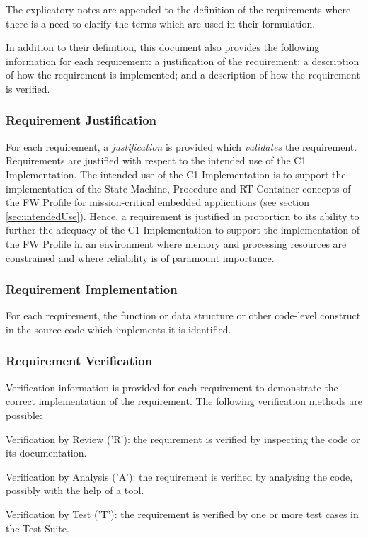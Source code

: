 \documentclass[requirements]{../fwprofile}
\begin{document}
The explicatory notes are appended to the definition of the requirements where there is a need to clarify the terms which are used in their formulation.

In addition to their definition, this document also provides the following information for each requirement: a justification of the requirement; a description of how the requirement is implemented; and a description of how the requirement is verified. 

\subsubsection{Requirement Justification}
For each requirement, a \emph{justification} is provided which \emph{validates} the requirement. Requirements are justified with respect to the intended use of the C1 Implementation. The intended use of the C1 Implementation is to support the implementation of the State Machine, Procedure and RT Container concepts of the FW Profile for mission-critical embedded applications (see section \ref{sec:intendedUse}).  Hence, a requirement is justified in proportion to its ability to further the adequacy of the C1 Implementation to support the implementation of the FW Profile in an environment where memory and processing resources are constrained and where reliability is of paramount importance. 

\subsubsection{Requirement Implementation}
For each requirement, the function or data structure or other code-level construct in the source code which implements it is identified.

\subsubsection{Requirement Verification}\label{sec:reqVer}
Verification information is provided for each requirement to demonstrate the correct implementation of the requirement. The following verification methods are possible:

\begin{fw_itemize}
\item Verification by Review ('R'): the requirement is verified by inspecting the code or its documentation.
\item Verification by Analysis ('A'): the requirement is verified by analysing the code, possibly with the help of a tool.
\item Verification by Test ('T'): the requirement is verified by one or more test cases in the Test Suite.
\end{fw_itemize}
\end{document}

